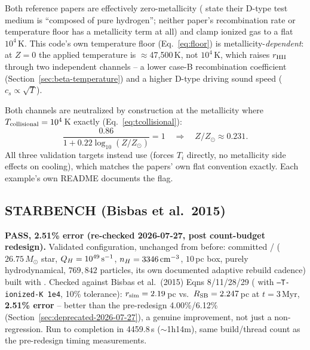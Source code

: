 Both reference papers are effectively zero-metallicity (\citet{Hu2017}
state their D-type test medium is ``composed of pure hydrogen''; neither
paper's recombination rate or temperature floor has a metallicity term
at all) and clamp ionized gas to a flat $10^4\,$K. This code's own
temperature floor (Eq.~\ref{eq:floor}) is metallicity-\emph{dependent}:
at $Z=0$ the applied temperature is $\approx$47,500\,K, not $10^4\,$K,
which raises $r_{\rm HII}$ through two independent channels -- a lower
case-B recombination coefficient (Section~\ref{sec:beta-temperature})
and a higher D-type driving sound speed ($c_s\propto\sqrt T$).

Both channels are neutralized by construction at the metallicity where
$T_{\rm collisional}=10^4\,$K exactly (Eq.~\ref{eq:tcollisional}):
\begin{equation}
  \frac{0.86}{1+0.22\log_{10}(Z/Z_\odot)} = 1
  \quad\Longrightarrow\quad Z/Z_\odot \approx 0.231.
  \label{eq:z0231}
\end{equation}
All three validation targets instead use
(forces $T_i$ directly, no metallicity side effects on cooling), which
matches the papers' own flat convention exactly. Each example's own
README documents the flag.

\subsection{STARBENCH (Bisbas et al.\ 2015)}
\label{sec:starbench-current}

\textbf{PASS, 2.51\% error (re-checked 2026-07-27, post count-budget
redesign).} Validated configuration, unchanged from before: committed
/
($26.75\,M_\odot$ star, $Q_H=10^{49}\,{\rm s^{-1}}$,
$n_H=3346\,{\rm cm^{-3}}$, $10\,$pc box, purely hydrodynamical,
$769{,}842$ particles, its own documented adaptive rebuild cadence)
built with .
Checked against Bisbas et al.\ (2015) Eqns 8/11/28/29
( with \texttt{--T-ionized-K 1e4}, 10\% tolerance):
$r_{\rm sim}=2.19\,$pc vs.\ $R_{\rm SB}=2.247\,$pc at $t=3\,$Myr,
\textbf{2.51\% error} -- better than the pre-redesign 4.00\%/6.12\%
(Section~\ref{sec:deprecated-2026-07-27}), a genuine improvement, not
just a non-regression. Run to completion in 4459.8\,s ($\sim$1h14m),
same build/thread count as the pre-redesign timing measurements.

